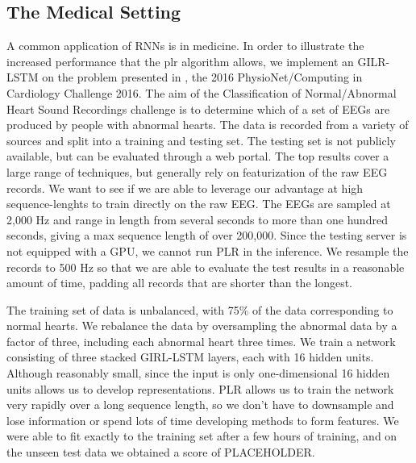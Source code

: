 \documentclass{article}
\begin{document}
\subsection{The Medical Setting}
A common application of RNNs is in medicine. In order to illustrate the
increased performance that the plr algorithm allows, we implement an GILR-LSTM
on the problem presented in , the 2016 PhysioNet/Computing in
Cardiology Challenge 2016.  The aim of the Classification of Normal/Abnormal
Heart Sound Recordings challenge is to determine which of a set of EEGs are
produced by people with abnormal hearts.  The data is recorded from a variety of
sources and split into a training and testing set. The testing set is not
publicly available, but can be evaluated through a web portal. The top results
cover a large range of techniques, but generally rely on featurization of the
raw EEG records. We want to see if we are able to leverage our advantage at high
sequence-lenghts to train directly on the raw EEG. The EEGs are sampled at 2,000
Hz and range in length from several seconds to more than one hundred seconds,
giving a max sequence length of over 200,000. Since the testing server is not
equipped with a GPU, we cannot run PLR in the inference. We resample the
records to 500 Hz so that we are able to evaluate the test results in a
reasonable amount of time, padding all records that are shorter than the longest.

The training set of data is unbalanced, with 75\% of the data corresponding to
normal hearts. We rebalance the data by oversampling the abnormal data by a factor
of three, including each abnormal heart three times. We train a network consisting
of three stacked GIRL-LSTM layers, each with 16 hidden units. Although reasonably
small, since the input is only one-dimensional 16 hidden units allows us to
develop representations. PLR allows us to train the network very rapidly over a
long sequence length, so we don't have to downsample and lose information or
spend lots of time developing methods to form features.
We were able to fit exactly to the training set after
a few hours of training, and on the unseen test data we obtained a score of
PLACEHOLDER.

\end{document}
